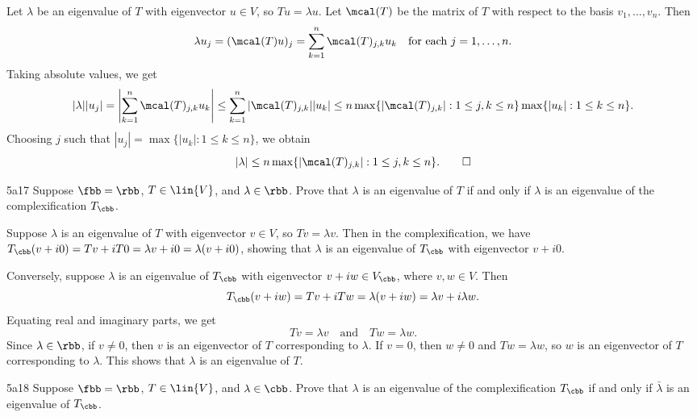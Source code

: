 \begin{sol}
    Let $\lambda$ be an eigenvalue of $T$ with eigenvector $u \in V$, so $Tu = \lambda u$.
	Let $\mcal(T)$ be the matrix of $T$ with respect to the basis $v_1, \ldots, v_n$.
	Then
    \[
    	\lambda u_j = (\mcal(T)u)_j = \sum_{k=1}^n \mcal(T)_{j, k} u_k \quad \text{for each } j = 1, \ldots, n.
    \]
    Taking absolute values, we get
    \[
    	|\lambda||u_j| = \left|\sum_{k=1}^n \mcal(T)_{j, k} u_k\right| \leq \sum_{k=1}^n |\mcal(T)_{j, k}| |u_k| \leq n \max\{|\mcal(T)_{j, k}| : 1 \leq j, k \leq n\} \max\{|u_k| : 1 \leq k \leq n\}.
    \]
    Choosing $j$ such that $|u_j| = \max\{|u_k| : 1 \leq k \leq n\}$, we obtain
    \[
    	|\lambda| \leq n \max\{|\mcal(T)_{j, k}| : 1 \leq j, k \leq n\}. \qedhere
    \]
\end{sol}

\begin{exercise}{5a17}
    Suppose $\fbb = \rbb$, $T \in \lin{V}$, and $\lambda \in \rbb$.
	Prove that $\lambda$ is an eigenvalue of $T$ if and only if $\lambda$ is an eigenvalue of the complexification $T_\cbb$.
    
\end{exercise}

\begin{sol}
    Suppose $\lambda$ is an eigenvalue of $T$ with eigenvector $v \in V$, so $Tv = \lambda v$.
	Then in the complexification, we have $T_\cbb(v + i0) = Tv + iT0 = \lambda v + i0 = \lambda (v + i0)$, showing that $\lambda$ is an eigenvalue of $T_\cbb$ with eigenvector $v + i0$.

    Conversely, suppose $\lambda$ is an eigenvalue of $T_\cbb$ with eigenvector $v + iw \in V_\cbb$, where $v, w \in V$.
	Then
    \[
    	T_\cbb(v + iw) = Tv + iTw = \lambda (v + iw) = \lambda v + i\lambda w.
    \]
    Equating real and imaginary parts, we get
    \[
    	Tv = \lambda v \quad \text{and} \quad Tw = \lambda w.
    \]
    Since $\lambda \in \rbb$, if $v \neq 0$, then $v$ is an eigenvector of $T$ corresponding to $\lambda$.
	If $v = 0$, then $w \neq 0$ and $Tw = \lambda w$, so $w$ is an eigenvector of $T$ corresponding to $\lambda$.
	This shows that $\lambda$ is an eigenvalue of $T$.
\end{sol}

\begin{exercise}{5a18}
    Suppose $\fbb = \rbb$, $T \in \lin{V}$, and $\lambda \in \cbb$.
	Prove that $\lambda$ is an eigenvalue of the complexification $T_\cbb$ if and only if $\bar{\lambda}$ is an eigenvalue of $T_\cbb$.
\end{exercise}

